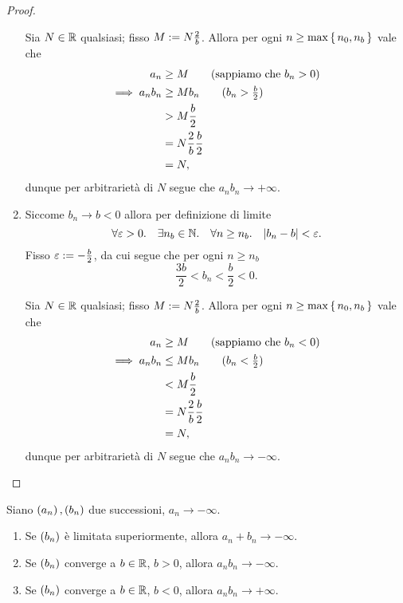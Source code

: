 \begin{proof}
\begin{enumerate}[label={(\roman*)}]
        Sia $N \in \mathbb{R}$ qualsiasi; fisso $M := N\frac{2}{b}$. Allora per ogni $n \geq \max \left\{\,n_0, n_b\,\right\}$ vale che \begin{align*}
            a_n &\geq M \tag{sappiamo che $b_n > 0$}\\
            \implies a_nb_n &\geq Mb_n \tag{$b_n > \frac{b}{2}$}\\
            &> M\frac{b}{2} \\
            &= N \frac{2}{b}\frac{b}{2}\\
            &= N,
        \end{align*}
        dunque per arbitrarietà di $N$ segue che $a_nb_n \to +\infty$.
        \item Siccome $b_n \to b < 0$ allora per definizione di limite \[
            \forall \eps > 0. \quad \exists n_b \in \N. \quad \forall n \geq n_b. \quad \abs*{b_n - b} < \eps.
        \] Fisso $\varepsilon := -\frac{b}{2}$, da cui segue che per ogni $n \geq n_b$ \[
            \frac{3b}{2} < b_n < \frac{b}{2} < 0.
        \]
        
        Sia $N \in \mathbb{R}$ qualsiasi; fisso $M := N\frac{2}{b}$. Allora per ogni $n \geq \max \left\{\,n_0, n_b\,\right\}$ vale che \begin{align*}
            a_n &\geq M \tag{sappiamo che $b_n < 0$}\\
            \implies a_nb_n &\leq Mb_n \tag{$b_n < \frac{b}{2}$}\\
            &< M\frac{b}{2} \\
            &= N \frac{2}{b}\frac{b}{2}\\
            &= N,
        \end{align*}
        dunque per arbitrarietà di $N$ segue che $a_nb_n \to -\infty$. \qedhere
    \end{enumerate}
\end{proof}

\begin{proposition}
     \label{prop:alg_inf_neg}
    Siano $\seqn*{a}, \seqn*{b}$ due successioni, $a_n \to -\infty$.
    \begin{enumerate}[label={(\roman*)}, ref={\theproposition: (\roman*)}]
        \item Se $\seqn*{b}$ è limitata superiormente, allora $a_n + b_n \to -\infty$.
        \item Se $\seqn*{b}$ converge a $b \in \mathbb{R}$, $b > 0$, allora $a_nb_n \to -\infty$.
        \item Se $\seqn*{b}$ converge a $b \in \mathbb{R}$, $b < 0$, allora $a_nb_n \to +\infty$.
    \end{enumerate}
\end{proposition}

